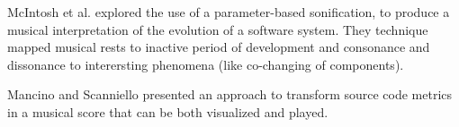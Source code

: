 McIntosh et al. \cite{McIntosh2014} explored the use of a parameter-based sonification, to produce a musical interpretation of the evolution of a software system.
They technique mapped musical rests to inactive period of development and consonance and dissonance to interersting phenomena (like co-changing of components).

Mancino and Scanniello \cite{Mancino2017} presented an approach to transform source code metrics in a musical score that can be both visualized and played. 